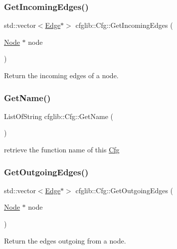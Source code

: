 \subsubsection{\texorpdfstring{Get\+Incoming\+Edges()}{GetIncomingEdges()}}
{\footnotesize\ttfamily std\+::vector$<$\hyperlink{classcfglib_1_1Edge}{Edge}$\ast$$>$ cfglib\+::\+Cfg\+::\+Get\+Incoming\+Edges (\begin{DoxyParamCaption}\item[{\hyperlink{classcfglib_1_1Node}{Node} $\ast$}]{node }\end{DoxyParamCaption})}

Return the incoming edges of a node. \mbox{\label{classcfglib_1_1Cfg_a429688de55701afc5e5e41a6cfcae050}} 
\subsubsection{\texorpdfstring{Get\+Name()}{GetName()}}
{\footnotesize\ttfamily List\+Of\+String cfglib\+::\+Cfg\+::\+Get\+Name (\begin{DoxyParamCaption}{ }\end{DoxyParamCaption})}

retrieve the function name of this \hyperlink{classcfglib_1_1Cfg}{Cfg} \mbox{\label{classcfglib_1_1Cfg_aea82731a4de76ef618bc91e8ab11c56b}} 
\subsubsection{\texorpdfstring{Get\+Outgoing\+Edges()}{GetOutgoingEdges()}}
{\footnotesize\ttfamily std\+::vector$<$\hyperlink{classcfglib_1_1Edge}{Edge}$\ast$$>$ cfglib\+::\+Cfg\+::\+Get\+Outgoing\+Edges (\begin{DoxyParamCaption}\item[{\hyperlink{classcfglib_1_1Node}{Node} $\ast$}]{node }\end{DoxyParamCaption})}

Return the edges outgoing from a node. \mbox{\label{classcfglib_1_1Cfg_ac5fcaa98be7d92862fa1cfa12bc539e6}} 
